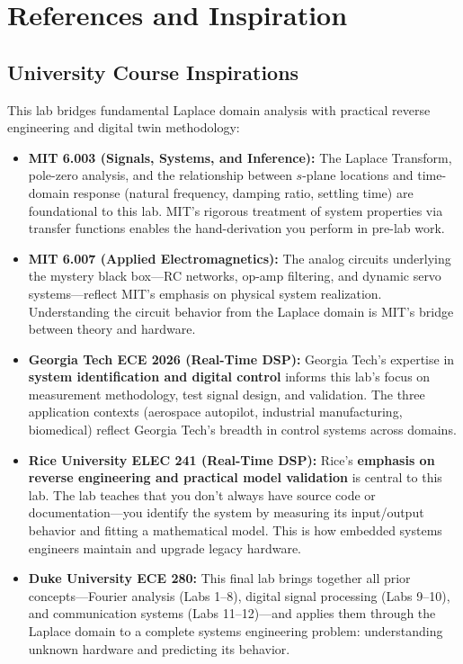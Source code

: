 \documentclass[11pt,letterpaper]{article}
\begin{document}
\clearpage

\section*{References and Inspiration}

\subsection*{University Course Inspirations}

This lab bridges fundamental Laplace domain analysis with practical reverse engineering and digital twin methodology:

\begin{itemize}
    \item \textbf{MIT 6.003 (Signals, Systems, and Inference):} The Laplace Transform, pole-zero analysis, and the relationship between $s$-plane locations and time-domain response (natural frequency, damping ratio, settling time) are foundational to this lab. MIT's rigorous treatment of system properties via transfer functions enables the hand-derivation you perform in pre-lab work.

    \item \textbf{MIT 6.007 (Applied Electromagnetics):} The analog circuits underlying the mystery black box—RC networks, op-amp filtering, and dynamic servo systems—reflect MIT's emphasis on physical system realization. Understanding the circuit behavior from the Laplace domain is MIT's bridge between theory and hardware.

    \item \textbf{Georgia Tech ECE 2026 (Real-Time DSP):} Georgia Tech's expertise in \textbf{system identification and digital control} informs this lab's focus on measurement methodology, test signal design, and validation. The three application contexts (aerospace autopilot, industrial manufacturing, biomedical) reflect Georgia Tech's breadth in control systems across domains.

    \item \textbf{Rice University ELEC 241 (Real-Time DSP):} Rice's \textbf{emphasis on reverse engineering and practical model validation} is central to this lab. The lab teaches that you don't always have source code or documentation—you identify the system by measuring its input/output behavior and fitting a mathematical model. This is how embedded systems engineers maintain and upgrade legacy hardware.

    \item \textbf{Duke University ECE 280:} This final lab brings together all prior concepts—Fourier analysis (Labs 1--8), digital signal processing (Labs 9--10), and communication systems (Labs 11--12)—and applies them through the Laplace domain to a complete systems engineering problem: understanding unknown hardware and predicting its behavior.
\end{itemize}
\end{document}
